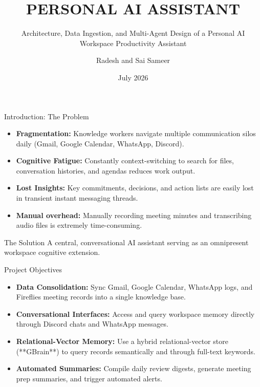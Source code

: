 \documentclass[10pt]{beamer}
\title[Personal AI Assistant]{PERSONAL AI ASSISTANT}
\subtitle{Architecture, Data Ingestion, and Multi-Agent Design of a Personal AI Workspace Productivity Assistant}
\author[Radesh \& Sai Sameer]{Radesh and Sai Sameer}
\institute[Accenture]{AI Research and Systems Engineering \\ AEH Interns, Accenture}
\date[July 2026]{July 2026}
\begin{document}
\begin{frame}
  \titlepage
\end{frame}

\begin{frame}{Introduction: The Problem}
  \begin{itemize}
    \item \textbf{Fragmentation:} Knowledge workers navigate multiple communication silos daily (Gmail, Google Calendar, WhatsApp, Discord).
    \item \textbf{Cognitive Fatigue:} Constantly context-switching to search for files, conversation histories, and agendas reduces work output.
    \item \textbf{Lost Insights:} Key commitments, decisions, and action lists are easily lost in transient instant messaging threads.
    \item \textbf{Manual overhead:} Manually recording meeting minutes and transcribing audio files is extremely time-consuming.
  \end{itemize}
  \vfill
  \begin{block}{The Solution}
    A central, conversational AI assistant serving as an omnipresent workspace cognitive extension.
  \end{block}
\end{frame}

\begin{frame}{Project Objectives}
  \begin{itemize}
    \item \textbf{Data Consolidation:} Sync Gmail, Google Calendar, WhatsApp logs, and Fireflies meeting records into a single knowledge base.
    \item \textbf{Conversational Interfaces:} Access and query workspace memory directly through Discord chats and WhatsApp messages.
    \item \textbf{Relational-Vector Memory:} Use a hybrid relational-vector store (**GBrain**) to query records semantically and through full-text keywords.
    \item \textbf{Automated Summaries:} Compile daily review digests, generate meeting prep summaries, and trigger automated alerts.
  \end{itemize}
\end{frame}
\end{document}
